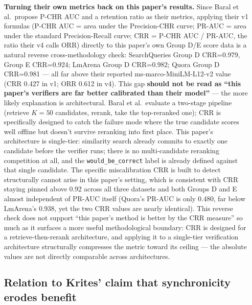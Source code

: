 \documentclass[11pt]{article}
\begin{document}
\textbf{Turning their own metrics back on this paper's results.} Since Baral et al.\ propose P-CHR AUC and a retention ratio as their metrics, applying their v1 formulas (P-CHR AUC = area under the Precision-CHR curve; PR-AUC = area under the standard Precision-Recall curve; CRR = P-CHR AUC / PR-AUC, the ratio their v4 calls ORR) directly to this paper's own Group D/E score data is a natural reverse cross-methodology check: SearchQueries Group D CRR=0.979, Group E CRR=0.924; LmArena Group D CRR=0.982; Quora Group D CRR=0.981 --- all far above their reported ms-marco-MiniLM-L12-v2 value (CRR 0.427 in v1; ORR 0.612 in v4). This gap \textbf{should not be read as ``this paper's verifiers are far better calibrated than their model''} --- the more likely explanation is architectural. Baral et al.\ evaluate a two-stage pipeline (retrieve $K{=}50$ candidates, rerank, take the top-reranked one); CRR is specifically designed to catch the failure mode where the true candidate scores well offline but doesn't survive reranking into first place. This paper's architecture is single-tier: similarity search already commits to exactly one candidate before the verifier runs; there is no multi-candidate reranking competition at all, and the \texttt{would\_\allowbreak{}be\_\allowbreak{}correct} label is already defined against that single candidate. The specific miscalibration CRR is built to detect structurally cannot arise in this paper's setting, which is consistent with CRR staying pinned above 0.92 across all three datasets and both Groups D and E almost independent of PR-AUC itself (Quora's PR-AUC is only 0.480, far below LmArena's 0.938, yet the two CRR values are nearly identical). This reverse check does not support ``this paper's method is better by the CRR measure'' so much as it surfaces a more useful methodological boundary: CRR is designed for a retrieve-then-rerank architecture, and applying it to a single-tier verification architecture structurally compresses the metric toward its ceiling --- the absolute values are not directly comparable across architectures.

\subsection{Relation to Krites' claim that synchronicity erodes benefit}
\end{document}
